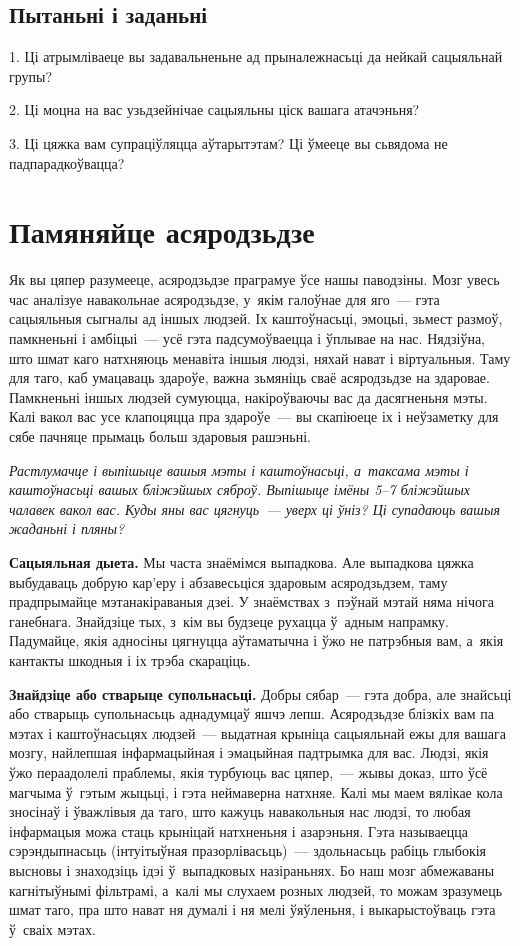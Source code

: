 \subsection*{Пытаньні і заданьні}

1. Ці атрымліваеце вы задавальненьне ад прыналежнасьці да нейкай сацыяльнай групы?

2. Ці моцна на вас узьдзейнічае сацыяльны ціск вашага атачэньня?

3. Ці цяжка вам супраціўляцца аўтарытэтам? Ці ўмееце вы сьвядома не падпарадкоўвацца?


\section{Памяняйце асяродзьдзе}

Як вы цяпер разумееце, асяродзьдзе праграмуе ўсе нашы паводзіны. Мозг увесь час аналізуе навакольнае асяродзьдзе, у~якім галоўнае для яго~--- гэта сацыяльныя сыгналы ад іншых людзей. Іх каштоўнасьці, эмоцыі, зьмест размоў, памкненьні і амбіцыі~--- усё гэта падсумоўваецца і ўплывае на нас. Нядзіўна, што шмат каго натхняюць менавіта іншыя людзі, няхай нават і віртуальныя. Таму для таго, каб умацаваць здароўе, важна зьмяніць сваё асяродзьдзе на здаровае. Памкненьні іншых людзей сумуюцца, накіроўваючы вас да дасягненьня мэты. Калі вакол вас усе клапоцяцца пра здароўе~--- вы скапіюеце іх і неўзаметку для сябе пачняце прымаць больш здаровыя рашэньні.

\emph{Растлумачце і выпішыце вашыя мэты і каштоўнасьці, а~таксама мэты і каштоўнасьці вашых бліжэйшых сяброў. Выпішыце імёны 5--7 бліжэйшых чалавек вакол вас. Куды яны вас цягнуць~--- уверх ці ўніз? Ці супадаюць вашыя жаданьні і пляны?}

\textbf{Сацыяльная дыета.} Мы часта знаёмімся выпадкова. Але выпадкова цяжка выбудаваць добрую кар'еру і абзавесьціся здаровым асяродзьдзем, таму прадпрымайце мэтанакіраваныя дзеі. У знаёмствах з~пэўнай мэтай няма нічога ганебнага. Знайдзіце тых, з~кім вы будзеце рухацца ў~адным напрамку. Падумайце, якія адносіны цягнуцца аўтаматычна і ўжо не патрэбныя вам, а~якія кантакты шкодныя і іх трэба скараціць.

\textbf{Знайдзіце або стварыце супольнасьці.} Добры сябар~--- гэта добра, але знайсьці або стварыць супольнасьць аднадумцаў яшчэ лепш. Асяродзьдзе блізкіх вам па мэтах і каштоўнасьцях людзей~--- выдатная крыніца сацыяльнай ежы для вашага мозгу, найлепшая інфармацыйная і эмацыйная падтрымка для вас. Людзі, якія ўжо пераадолелі праблемы, якія турбуюць вас цяпер,~--- жывы доказ, што ўсё магчыма ў~гэтым жыцьці, і гэта неймаверна натхняе. Калі мы маем вялікае кола зносінаў і ўважлівыя да таго, што кажуць навакольныя нас людзі, то любая інфармацыя можа стаць крыніцай натхненьня і азарэньня. Гэта называецца сэрэндыпнасьць (інтуітыўная празорлівасьць)~--- здольнасьць рабіць глыбокія высновы і знаходзіць ідэі ў~выпадковых назіраньнях. Бо наш мозг абмежаваны кагнітыўнымі фільтрамі, а~калі мы слухаем розных людзей, то можам зразумець шмат таго, пра што нават ня думалі і ня мелі ўяўленьня, і выкарыстоўваць гэта ў~сваіх мэтах.

